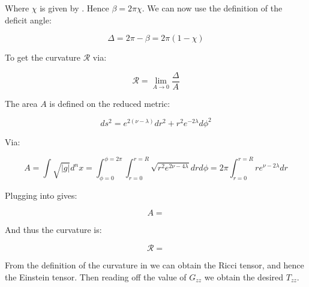 \documentclass[12pt]{article}
\begin{document}
\begin{appendices}
Where $\chi$ is given by . Hence $\beta=2\pi\chi$. We can now use the definition of the deficit angle:

\begin{equation}
\label{eq:deficit-angle}
\Delta=2\pi-\beta=2\pi(1-\chi)
\end{equation}

To get the curvature $\mathcal{R}$ via:

\begin{equation}
\label{eq:curvature}
\mathcal{R}=\lim_{A\rightarrow 0}\frac{\Delta}{A}
\end{equation}

The area $A$ is defined on the reduced metric:

\begin{equation}
ds^2=e^{2(\nu-\lambda)}dr^2+r^2 e^{-2\lambda}d\phi^2
\end{equation}

Via:

\begin{equation}
\label{eq:area}
A=\int\sqrt{|g|}d^n x=\int_{\phi=0}^{\phi=2\pi}\int_{r=0}^{r=R}\sqrt{r^2 e^{2\nu-4\lambda}}drd\phi=2\pi\int_{r=0}^{r=R}re^{\nu-2\lambda}dr
\end{equation}

Plugging  into  gives:

\begin{equation}
\label{eq:area-solved}
A=
\end{equation}

And thus the curvature is:

\begin{equation}
\label{eq:curvature-solved}
\mathcal{R}=
\end{equation}

From the definition of the curvature in  we can obtain the Ricci tensor, and hence the Einstein tensor. Then reading off the value of $G_{zz}$ we obtain the desired $T_{zz}$.
\end{appendices}



\end{document}
